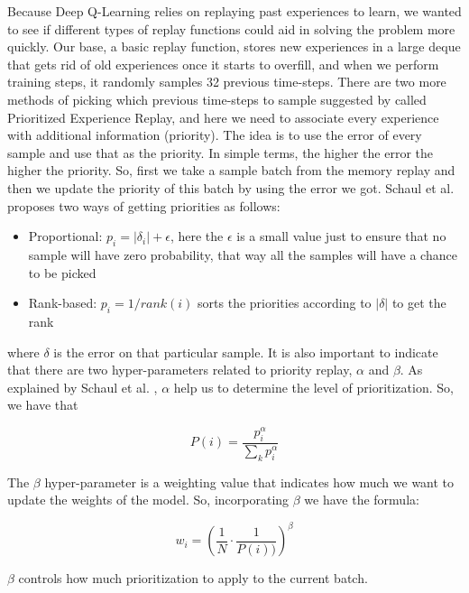 \documentclass[conference]{IEEEtran}
\begin{document}
Because Deep Q-Learning relies on replaying past experiences to learn, we wanted to see if different types of replay functions could aid in solving the problem more quickly. Our base, a basic replay function, stores new experiences in a large deque that gets rid of old experiences once it starts to overfill, and when we perform training steps, it randomly samples 32 previous time-steps. There are two more methods of picking which previous time-steps to sample suggested by \cite{schaul2016prioritized} called Prioritized Experience Replay, and here we need to associate every experience with additional information (priority). The idea is to use the error of every sample and use that as the priority. In simple terms, the higher the error the higher the priority. So, first we take a sample batch from the memory replay and then we update the priority of this batch by using the error we got. Schaul et al. \cite{schaul2016prioritized} proposes two ways of getting priorities as follows:

\begin{itemize}
    \item Proportional: $p_i=|\delta_i|+\epsilon$, here the $\epsilon$ is a small value just to ensure that no sample will have zero probability, that way all the samples will have a chance to be picked
    \item Rank-based: $ p_i = 1/rank(i)$ sorts the priorities according to $|\delta| $ to get the rank
\end{itemize}

where $\delta$ is the error on that particular sample. It is also important to indicate that there are two hyper-parameters related to priority replay, $\alpha$ and $\beta$. As explained by Schaul et al. \cite{schaul2016prioritized}, $\alpha$ help us to determine the level of prioritization. So, we have that

\begin{equation}
    P(i)=\frac{p_{i}^{\alpha}}{\sum_{k}p_{i}^{\alpha}}
\end{equation}

The $\beta$ hyper-parameter is a weighting value that indicates how much we want to update the weights of the model. So, incorporating $\beta$ we have the formula:

\begin{equation}
    w_i = \left ( \frac{1}{N} \cdot \frac{1}{P(i))} \right )^\beta
\end{equation}

$\beta$ controls how much prioritization to apply to the current batch.
\end{document}
